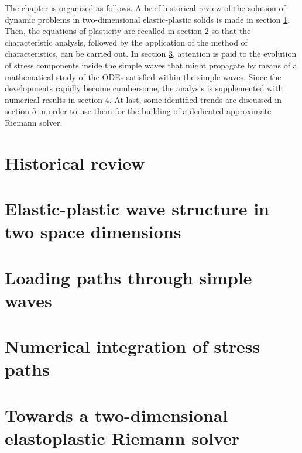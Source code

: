 The chapter is organized as follows.
A brief historical review of the solution of dynamic problems in two-dimensional elastic-plastic solids is made in section \ref{sec:review}.
Then, the equations of plasticity are recalled in section \ref{sec:charac_plast} so that the characteristic analysis, followed by the application of the method of characteristics, can be carried out.
In section \ref{sec:stress_paths}, attention is paid to the evolution of stress components inside the simple waves that might propagate by means of a mathematical study of the ODEs satisfied within the simple waves.
Since the developments rapidly become cumbersome, the analysis is supplemented with numerical results in section \ref{sec:stress_paths_num}.
At last, some identified trends are discussed in section \ref{sec:ep_Riemman_solver} in order to use them for the building of a dedicated approximate Riemann solver. 

\section{Historical review}
\label{sec:review}


\section{Elastic-plastic wave structure in two space dimensions}
\label{sec:charac_plast}


\section{Loading paths through simple waves}
\label{sec:stress_paths}



\section{Numerical integration of stress paths}
\label{sec:stress_paths_num}


\section{Towards a two-dimensional elastoplastic Riemann solver}
\label{sec:ep_Riemman_solver}




